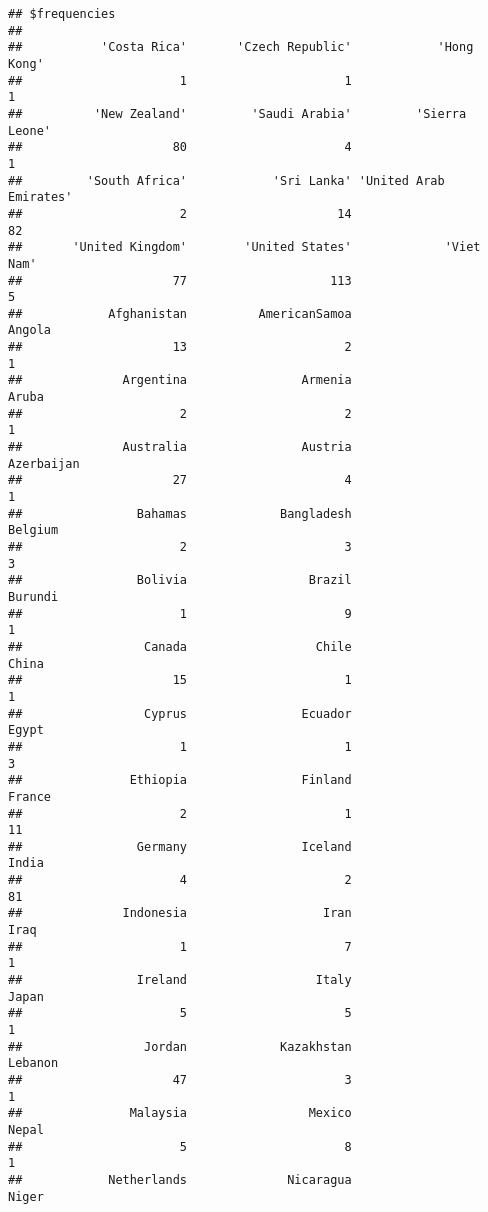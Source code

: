 \documentclass[
]{article}
\begin{document}
\begin{verbatim}
## $frequencies
## 
##           'Costa Rica'       'Czech Republic'            'Hong Kong' 
##                      1                      1                      1 
##          'New Zealand'         'Saudi Arabia'         'Sierra Leone' 
##                     80                      4                      1 
##         'South Africa'            'Sri Lanka' 'United Arab Emirates' 
##                      2                     14                     82 
##       'United Kingdom'        'United States'             'Viet Nam' 
##                     77                    113                      5 
##            Afghanistan          AmericanSamoa                 Angola 
##                     13                      2                      1 
##              Argentina                Armenia                  Aruba 
##                      2                      2                      1 
##              Australia                Austria             Azerbaijan 
##                     27                      4                      1 
##                Bahamas             Bangladesh                Belgium 
##                      2                      3                      3 
##                Bolivia                 Brazil                Burundi 
##                      1                      9                      1 
##                 Canada                  Chile                  China 
##                     15                      1                      1 
##                 Cyprus                Ecuador                  Egypt 
##                      1                      1                      3 
##               Ethiopia                Finland                 France 
##                      2                      1                     11 
##                Germany                Iceland                  India 
##                      4                      2                     81 
##              Indonesia                   Iran                   Iraq 
##                      1                      7                      1 
##                Ireland                  Italy                  Japan 
##                      5                      5                      1 
##                 Jordan             Kazakhstan                Lebanon 
##                     47                      3                      1 
##               Malaysia                 Mexico                  Nepal 
##                      5                      8                      1 
##            Netherlands              Nicaragua                  Niger 

\end{verbatim}
\end{document}
